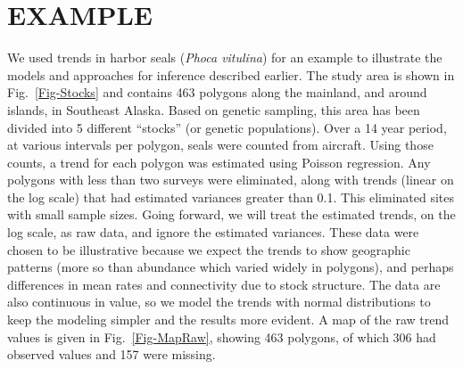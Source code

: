 \documentclass[11pt, titlepage]{article}\usepackage[]{graphicx}\usepackage[]{color}
\begin{document}

\section*{EXAMPLE}






























We used trends in harbor seals (\emph{Phoca vitulina}) for an example to illustrate the models and approaches for inference described earlier. The study area is shown in Fig.~\ref{Fig-Stocks} and contains 463 polygons along the mainland, and around islands, in Southeast Alaska.  Based on genetic sampling, this area has been divided into 5 different ``stocks'' (or genetic populations). Over a 14 year period, at various intervals per polygon, seals were counted from aircraft.  Using those counts, a trend for each polygon was estimated using Poisson regression.  Any polygons with less than two surveys were eliminated, along with trends (linear on the log scale) that had estimated variances greater than 0.1.  This eliminated sites with small sample sizes.  Going forward, we will treat the estimated trends, on the log scale, as raw data, and ignore the estimated variances.  These data were chosen to be illustrative because we expect the trends to show geographic patterns (more so than abundance which varied widely in polygons), and perhaps differences in mean rates and connectivity due to stock structure. The data are also continuous in value, so we model the trends with normal distributions to keep the modeling simpler and the results more evident.  A map of the raw trend values is given in Fig.~\ref{Fig-MapRaw}, showing 463 polygons, of which 306 had observed values and 157 were missing.
\end{document}
